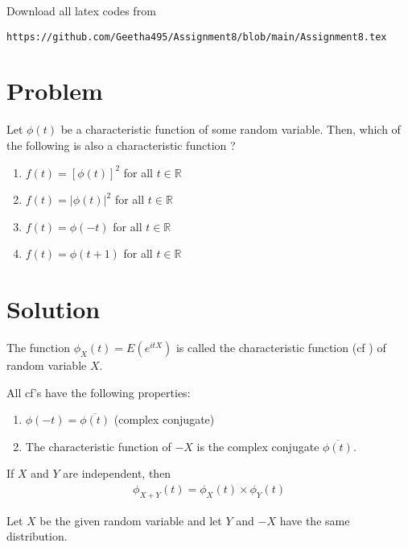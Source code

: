 \documentclass[journal,12pt,twocolumn]{IEEEtran}
\begin{document}
Download all latex codes from 
\begin{lstlisting}
https://github.com/Geetha495/Assignment8/blob/main/Assignment8.tex
\end{lstlisting}
\section{Problem}
Let $\phi(t)$ be a characteristic function of some random variable.  Then, which of the following is also a characteristic function ?
\begin{enumerate}
    \item $f(t) = [\phi(t)]^2$ for all $t \in \mathbb{R}$
    \item $f(t) = |\phi(t)|^2$ for all $t \in \mathbb{R}$
    \item $f(t) = \phi(-t)$ for all $t \in \mathbb{R}$
    \item $f(t) = \phi(t+1)$ for all $t \in \mathbb{R}$
\end{enumerate}
\section{Solution}
\begin{definition}
 The function $\phi_X(t) = E(e^{itX})$ is called the characteristic function (cf ) of random variable $X$.
 \label{def:characterstic_function}
\end{definition}

\begin{proposition}
All cf’s have the following properties:\\
\begin{enumerate}
    \item $\phi(-t) =\overline{\phi(t)}$ (complex conjugate)
    \item  The characteristic function of  $ -X$ is the complex conjugate $\overline{\phi(t)}$.
\end{enumerate}
\label{prop:properties_of_cf}
\end{proposition}
\begin{proposition}
 If $X$ and $Y$ are independent, then
 \begin{align*}
     \phi_{X+Y}(t) = \phi_X(t)\times\phi_Y(t)
 \end{align*}
 \label{prop:Sum_of_independent_cvs}
\end{proposition}
Let $X$ be the given random variable and let $Y$  and $-X$ have the same distribution.
\end{document}
